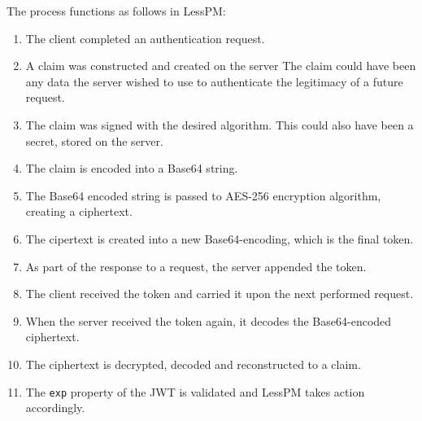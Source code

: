 The process functions as follows in LessPM:
\begin{enumerate}
  \item The client completed an authentication request.
  \item A claim was constructed and created on the server
  The claim could have been any data the server wished to use to authenticate
  the legitimacy of a future request.
  \item The claim was signed with the desired algorithm.
  This could also have been a secret, stored on the server.
  \item The claim is encoded into a Base64 string.
  \item The Base64 encoded string is passed to AES-256 encryption algorithm,
  creating a ciphertext.
  \item The cipertext is created into a new Base64-encoding, which is the
  final token.
  \item As part of the response to a request, the server appended the
  token.
  \item The client received the token and carried it upon the next performed
  request.
  \item When the server received the token again, it decodes the
  Base64-encoded ciphertext.
  \item The ciphertext is decrypted, decoded and reconstructed to a claim.
  \item The \texttt{exp} property of the JWT is validated and LessPM takes
  action accordingly.
\end{enumerate}



